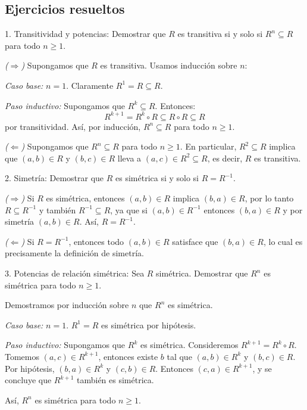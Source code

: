 \subsection*{Ejercicios resueltos}
\begin{exampleblock}{1. Transitividad y potencias:} Demostrar que $R$ es transitiva si y solo si $R^n \subseteq R$ para todo $n \geq 1$.

\emph{($\Rightarrow$)} Supongamos que $R$ es transitiva. Usamos inducción sobre $n$:

\textit{Caso base:} $n = 1$. Claramente $R^1 = R \subseteq R$.

\textit{Paso inductivo:} Supongamos que $R^k \subseteq R$. Entonces:
\[ R^{k+1} = R^k \circ R \subseteq R \circ R \subseteq R \]
por transitividad. Así, por inducción, $R^n \subseteq R$ para todo $n \geq 1$.

\emph{($\Leftarrow$)} Supongamos que $R^n \subseteq R$ para todo $n \geq 1$. En particular, $R^2 \subseteq R$ implica que $(a,b) \in R$ y $(b,c) \in R$ lleva a $(a,c) \in R^2 \subseteq R$, es decir, $R$ es transitiva.
\end{exampleblock}
\bigskip
\begin{exampleblock}{2. Simetría:} Demostrar que $R$ es simétrica si y solo si $R = R^{-1}$.

\emph{($\Rightarrow$)} Si $R$ es simétrica, entonces $(a,b) \in R$ implica $(b,a) \in R$, por lo tanto $R \subseteq R^{-1}$ y también $R^{-1} \subseteq R$, ya que si $(a,b) \in R^{-1}$ entonces $(b,a) \in R$ y por simetría $(a,b) \in R$. Así, $R = R^{-1}$.

\emph{($\Leftarrow$)} Si $R = R^{-1}$, entonces todo $(a,b) \in R$ satisface que $(b,a) \in R$, lo cual es precisamente la definición de simetría.
\end{exampleblock}
\bigskip
\begin{exampleblock}{3. Potencias de relación simétrica:} Sea $R$ simétrica. Demostrar que $R^n$ es simétrica para todo $n \geq 1$.

Demostramos por inducción sobre $n$ que $R^n$ es simétrica.

\textit{Caso base:} $n = 1$. $R^1 = R$ es simétrica por hipótesis.

\textit{Paso inductivo:} Supongamos que $R^k$ es simétrica. Consideremos $R^{k+1} = R^k \circ R$. Tomemos $(a,c) \in R^{k+1}$, entonces existe $b$ tal que $(a,b) \in R^k$ y $(b,c) \in R$. Por hipótesis, $(b,a) \in R^k$ y $(c,b) \in R$. Entonces $(c,a) \in R^{k+1}$, y se concluye que $R^{k+1}$ también es simétrica.

Así, $R^n$ es simétrica para todo $n \geq 1$.
\end{exampleblock}


